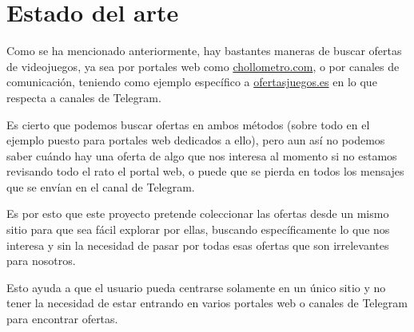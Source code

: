 \chapter{Estado del arte}

Como se ha mencionado anteriormente, hay bastantes maneras de buscar ofertas de 
videojuegos, ya sea por portales web como \url{chollometro.com}, o por canales de 
comunicación, teniendo como ejemplo específico a \url{ofertasjuegos.es} en lo que 
respecta a canales de Telegram.

Es cierto que podemos buscar ofertas en ambos métodos (sobre todo en el ejemplo 
puesto para portales web dedicados a ello), pero aun así no podemos saber cuándo 
hay una oferta de algo que nos interesa al momento si no estamos revisando todo el 
rato el portal web, o puede que se pierda en todos los mensajes que se envían en el 
canal de Telegram.

Es por esto que este proyecto pretende coleccionar las ofertas desde un mismo sitio 
para que sea fácil explorar por ellas, buscando específicamente lo que nos interesa 
y sin la necesidad de pasar por todas esas ofertas que son irrelevantes para 
nosotros.

Esto ayuda a que el usuario pueda centrarse solamente en un único sitio y no tener 
la necesidad de estar entrando en varios portales web o canales de Telegram para 
encontrar ofertas.